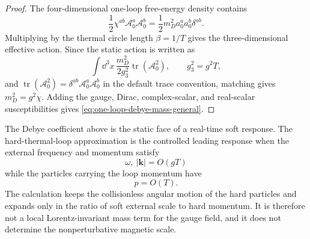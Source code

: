 \begin{proof}
The four-dimensional one-loop free-energy density contains
\[
  \frac12\chi^{ab}\mathcal A_0^a\mathcal A_0^b
  =
  \frac12m_D^2 a_0^a a_0^b\delta^{ab}.
\]
Multiplying by the thermal circle length \(\beta=1/T\) gives the
three-dimensional effective action.  Since the static action is written as
\[
  \int\dd^3x\,
  \frac{m_D^2}{2g_3^2}\operatorname{tr}(\mathcal A_0^2),
  \qquad
  g_3^2=g^2T,
\]
and \(\operatorname{tr}(\mathcal A_0^2)
=\delta^{ab}\mathcal A_0^a\mathcal A_0^b\) in the default trace convention,
matching gives \(m_D^2=g^2\chi\).  Adding the gauge, Dirac, complex-scalar,
and real-scalar susceptibilities gives
\eqref{eq:one-loop-debye-mass-general}.
\end{proof}

\begin{controlledapproximation}
\label{ca:thermal-screening-htl-bridge}
The Debye coefficient above is the static face of a real-time soft response.
The hard-thermal-loop approximation is the controlled leading response when
the external frequency and momentum satisfy
\[
  \omega,\ |\mathbf k|=O(gT)
\]
while the particles carrying the loop momentum have
\[
  p=O(T).
\]
The calculation keeps the collisionless angular motion of the hard particles
and expands only in the ratio of soft external scale to hard momentum.  It is
therefore not a local Lorentz-invariant mass term for the gauge field, and it
does not determine the nonperturbative magnetic scale.
\end{controlledapproximation}

